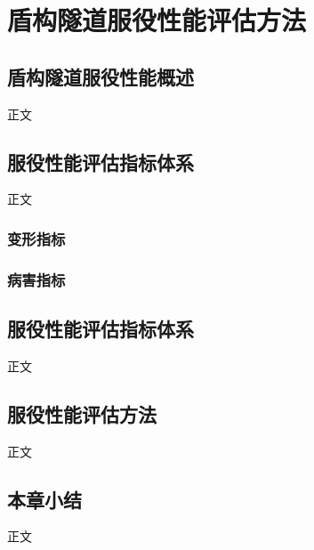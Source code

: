 \chapter{盾构隧道服役性能评估方法}
\label{chap:TSI}

\section{盾构隧道服役性能概述}

正文




\section{服役性能评估指标体系}

正文




\subsection{变形指标}





\subsection{病害指标}





\section{服役性能评估指标体系}

正文





\section{服役性能评估方法}

正文





\section{本章小结}

正文